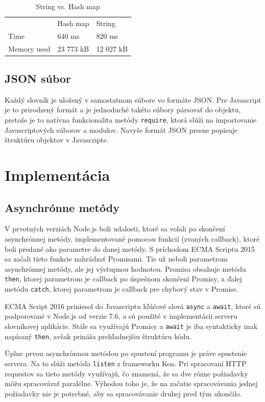 \documentclass[
  digital, %
  table,   %
  lof,     %
  lot,     %
]{fithesis3}
\begin{document}
\begin{table}[]
\centering
\caption{String vs. Hash map}
\label{tab:string-hash}
\begin{tabular}{lll}
     & Hash map & String   \\
Time & 640 ms   & 820 ms   \\
Memory used & 23 773 kB & 12 027 kB
\end{tabular}
\end{table}

\subsection{JSON súbor}
Každý slovník je uložený v samostatnom súbore vo formáte JSON. Pre Javascript je to prirodzený formát a je jednoduché takéto súbory pársovať do objektu, pretože je to natívna funkcionalita metódy \texttt{require}, ktorá slúži na importovanie Javascriptových súborov a modulov. Navyše formát JSON presne popisuje štruktúru objektov v Javascripte.


\section{Implementácia}
\subsection{Asynchrónne metódy}
V prvotných verziách Node.js boli udalosti, ktoré sa volali po skončení asynchrónnej metódy, implementované pomocou funkcií (zvaných callback), ktoré boli predané ako parametre do danej metódy. S príchodom ECMA Scriptu 2015 sa začali tieto funkcie nahrádzať Promisami. Tie už neboli parametrom asynchrónnej metódy, ale jej výstupnou hodnotou. Promisa obsahuje metódu \texttt{then}, ktorej parametrom je callback po úspešnom skončení Promisy, a ďalej metódu \texttt{catch}, ktorej parametrom je callback pre chybový stav v Promise.

ECMA Script 2016 priniesol do Javascriptu kľúčové slová \texttt{async} a \texttt{await}, ktoré sú podporované v Node.js od verzie 7.6, a sú použité v implementácii serveru slovníkovej aplikácie. Stále sa využívajú Promisy a \texttt{await} je iba syntakticky inak napísaný \texttt{then}, avšak prináša prehľadnejšiu štruktúru kódu.

Úplne prvou asynchrónnou metódou po spustení programu je práve spustenie servera. Na to slúži metóda \texttt{listen} z frameworku Koa. Pri spracovaní HTTP requestov sa tieto metódy využívajú, čo znamená, že sa dve rôzne požiadavky môžu spracovávať paralélne. Výhodou toho je, že na začatie spracovávania jednej požiadavky nie je potrebné, aby sa spracovávanie druhej pred tým ukončilo.
\end{document}
